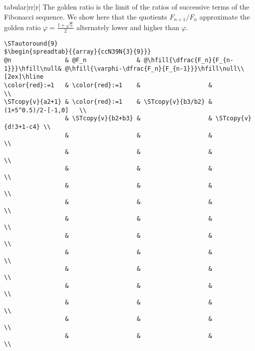 \documentclass[a4paper,10pt]{article}
\begin{document}
\begin{<table environment>}
\begin{spreadtab}{{tabular}{|rr|r|}}
The golden ratio is the limit of the ratios of successive terms of the Fibonacci sequence. We show here that the quotients $F_{n+1}/F_n$ approximate the golden ratio $\varphi=\frac{1+\sqrt{5}}{2}$ alternately lower and higher than $\varphi$.\par\nobreak
\begin{lstlisting}
\STautoround{9}
$\begin{spreadtab}{{array}{ccN39N{3}{9}}}
@n               & @F_n              & @\hfill{\dfrac{F_n}{F_{n-1}}}\hfill\null& @\hfill{\varphi-\dfrac{F_n}{F_{n-1}}}\hfill\null\\[2ex]\hline
\color{red}:=1   & \color{red}:=1    &                   &                      \\
\STcopy{v}{a2+1} & \color{red}:=1    & \STcopy{v}{b3/b2} & (1+5^0.5)/2-[-1,0]   \\
                 & \STcopy{v}{b2+b3} &                   & \STcopy{v}{d!3+1-c4} \\
                 &                   &                   &                      \\
                 &                   &                   &                      \\
                 &                   &                   &                      \\
                 &                   &                   &                      \\
                 &                   &                   &                      \\
                 &                   &                   &                      \\
                 &                   &                   &                      \\
                 &                   &                   &                      \\
                 &                   &                   &                      \\
                 &                   &                   &                      \\
                 &                   &                   &                      \\
                 &                   &                   &                      \\
                 &                   &                   &                      \\

\end{lstlisting}
\end{spreadtab}
\end{<table environment>}
\end{document}
